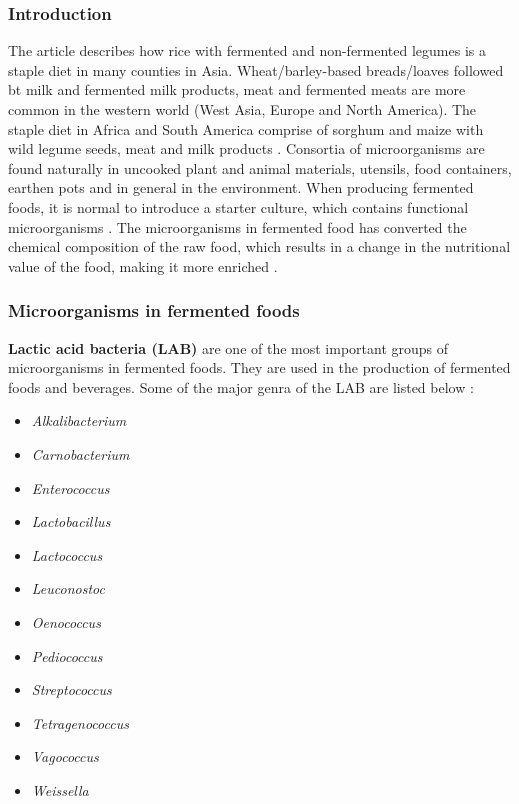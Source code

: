 \subsubsection*{Introduction}
The article describes how rice with fermented and non-fermented legumes is a staple diet in many counties in Asia. Wheat/barley-based breads/loaves followed bt milk and fermented milk products, meat and fermented meats are more common in the western world (West Asia, Europe and North America). The staple diet in Africa and South America comprise of sorghum and maize with wild legume seeds, meat and milk products \cite*{L1-DiversityMicro}. 
Consortia of microorganisms are found naturally in uncooked plant and animal materials, utensils, food containers, earthen pots and in general in the environment. When producing fermented foods, it is normal to introduce a starter culture, which contains functional microorganisms \cite*{L1-DiversityMicro}. The microorganisms in fermented food has converted the chemical composition of the raw food, which results in a change in the nutritional value of the food, making it more enriched \cite*{L1-DiversityMicro}.

\subsubsection*{Microorganisms in fermented foods}

\textbf{Lactic acid bacteria (LAB)} are one of the most important groups of microorganisms in fermented foods. They are used in the production of fermented foods and beverages. Some of the major genra of the LAB are listed below \cite*{L1-DiversityMicro}:
\begin{highlight}
    \begin{multicols}{3}
        \begin{itemize}
            \item \textit{Alkalibacterium}
            \item \textit{Carnobacterium}
            \item \textit{Enterococcus}
            \item \textit{Lactobacillus}
            \item \textit{Lactococcus}
            \item \textit{Leuconostoc}
            \item \textit{Oenococcus}
            \item \textit{Pediococcus}
            \item \textit{Streptococcus}
            \item \textit{Tetragenococcus}
            \item \textit{Vagococcus}
            \item \textit{Weissella}
        \end{itemize}
    \end{multicols}
\end{highlight}

